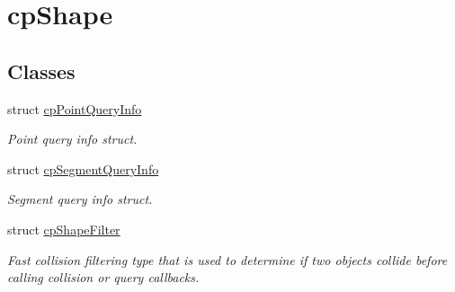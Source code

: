 \hypertarget{group__cp_shape}{}\section{cp\+Shape}
\label{group__cp_shape}
\subsection*{Classes}
\begin{DoxyCompactItemize}
\item 
struct \mbox{\hyperlink{structcp_point_query_info}{cp\+Point\+Query\+Info}}
\begin{DoxyCompactList}\small\item\em Point query info struct. \end{DoxyCompactList}\item 
struct \mbox{\hyperlink{structcp_segment_query_info}{cp\+Segment\+Query\+Info}}
\begin{DoxyCompactList}\small\item\em Segment query info struct. \end{DoxyCompactList}\item 
struct \mbox{\hyperlink{structcp_shape_filter}{cp\+Shape\+Filter}}
\begin{DoxyCompactList}\small\item\em Fast collision filtering type that is used to determine if two objects collide before calling collision or query callbacks. \end{DoxyCompactList}\end{DoxyCompactItemize}
